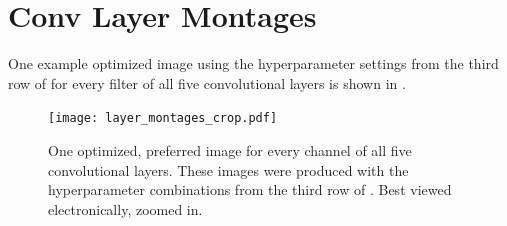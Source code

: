 \documentclass{article}
\begin{document}
\section{Conv Layer Montages}

One example optimized image using the hyperparameter settings from the third row of  for every filter of all five convolutional layers is shown in .


\begin{figure}[ht]
\vskip 0.2in
\begin{center}
\centerline{\texttt{[image: layer\_montages\_crop.pdf]}}
\caption{One optimized, preferred image for every channel of all five convolutional layers. These images were produced with the hyperparameter combinations from the third row of . Best viewed electronically, zoomed in.}
\end{center}
\vskip -0.2in
\end{figure}
\end{document}
